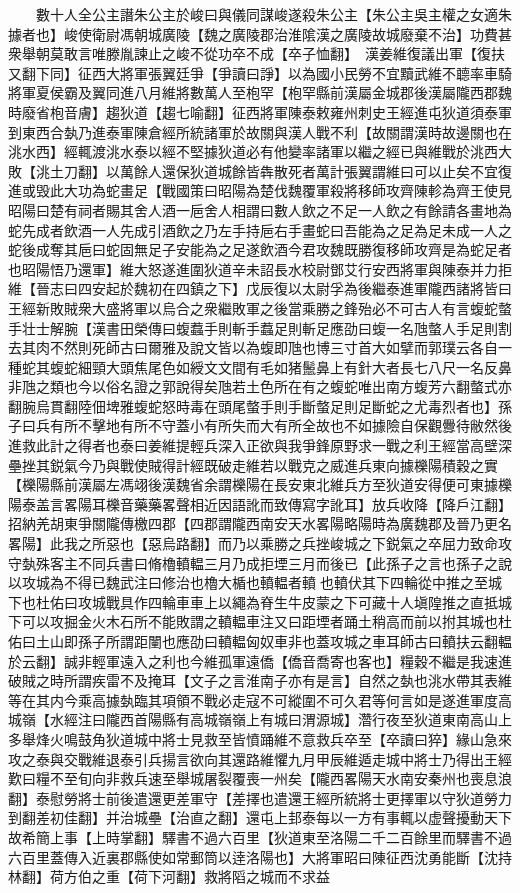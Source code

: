 　　數十人全公主譖朱公主於峻曰與儀同謀峻遂殺朱公主【朱公主吳主權之女適朱據者也】峻使衛尉馮朝城廣陵【魏之廣陵郡治淮隂漢之廣陵故城廢棄不治】功費甚衆舉朝莫敢言唯滕胤諫止之峻不從功卒不成【卒子恤翻】　漢姜維復議出軍【復扶又翻下同】征西大將軍張翼廷爭【爭讀曰諍】以為國小民勞不宜黷武維不聼率車騎將軍夏侯霸及翼同進八月維將數萬人至枹罕【枹罕縣前漢屬金城郡後漢屬隴西郡魏時廢省枹音膚】趨狄道【趨七喻翻】征西將軍陳泰敕雍州刺史王經進屯狄道須泰軍到東西合埶乃進泰軍陳倉經所統諸軍於故關與漢人戰不利【故關謂漢時故邊關也在洮水西】經輒渡洮水泰以經不堅據狄道必有他變率諸軍以繼之經已與維戰於洮西大敗【洮土刀翻】以萬餘人還保狄道城餘皆犇散死者萬計張翼謂維曰可以止矣不宜復進或毁此大功為蛇畫足【戰國策曰昭陽為楚伐魏覆軍殺將移師攻齊陳軫為齊王使見昭陽曰楚有祠者賜其舍人酒一巵舍人相謂曰數人飲之不足一人飲之有餘請各畫地為蛇先成者飲酒一人先成引酒飲之乃左手持巵右手畫蛇曰吾能為之足為足未成一人之蛇後成奪其巵曰蛇固無足子安能為之足遂飲酒今君攻魏既勝復移師攻齊是為蛇足者也昭陽悟乃還軍】維大怒遂進圍狄道辛未詔長水校尉鄧艾行安西將軍與陳泰并力拒維【晉志曰四安起於魏初在四鎮之下】戊辰復以太尉孚為後繼泰進軍隴西諸將皆曰王經新敗賊衆大盛將軍以烏合之衆繼敗軍之後當乘勝之鋒殆必不可古人有言蝮蛇螫手壮士解腕【漢書田榮傳曰蝮蠚手則斬手蠚足則斬足應劭曰蝮一名虺螫人手足則割去其肉不然則死師古曰爾雅及說文皆以為蝮即虺也博三寸首大如擘而郭璞云各自一種蛇其蝮蛇細頸大頭焦尾色如綬文文間有毛如猪鬛鼻上有針大者長七八尺一名反鼻非虺之類也今以俗名證之郭說得矣虺若土色所在有之蝮蛇唯出南方蝮芳六翻螫式亦翻腕烏貫翻陸佃埤雅蝮蛇怒時毒在頭尾螫手則手斷螫足則足斷蛇之尤毒烈者也】孫子曰兵有所不擊地有所不守蓋小有所失而大有所全故也不如據險自保觀釁待敝然後進救此計之得者也泰曰姜維提輕兵深入正欲與我爭鋒原野求一戰之利王經當高壁深壘挫其鋭氣今乃與戰使賊得計經既破走維若以戰克之威進兵東向據櫟陽積穀之實【櫟陽縣前漢屬左馮翊後漢魏省余謂櫟陽在長安東北維兵方至狄道安得便可東據櫟陽泰盖言畧陽耳櫟音藥藥畧聲相近因語訛而致傳寫字訛耳】放兵收降【降戶江翻】招納羌胡東爭關隴傳檄四郡【四郡謂隴西南安天水畧陽略陽時為廣魏郡及晉乃更名畧陽】此我之所惡也【惡烏路翻】而乃以乘勝之兵挫峻城之下鋭氣之卒屈力致命攻守埶殊客主不同兵書曰脩櫓轒輼三月乃成拒堙三月而後已【此孫子之言也孫子之說以攻城為不得已魏武注曰修治也櫓大楯也轒輼者轒也轒伏其下四輪從中推之至城下也杜佑曰攻城戰具作四輪車車上以繩為脊生牛皮蒙之下可藏十人塡隍推之直抵城下可以攻掘金火木石所不能敗謂之轒輼車注又曰距堙者踊土稍高而前以拊其城也杜佑曰土山即孫子所謂距闉也應劭曰轒輼匈奴車非也蓋攻城之車耳師古曰轒扶云翻輼於云翻】誠非輕軍遠入之利也今維孤軍遠僑【僑音喬寄也客也】糧穀不繼是我速進破賊之時所謂疾雷不及掩耳【文子之言淮南子亦有是言】自然之埶也洮水帶其表維等在其内今乘高據埶臨其項領不戰必走寇不可縱圍不可久君等何言如是遂進軍度高城嶺【水經注曰隴西首陽縣有高城嶺嶺上有城曰渭源城】濳行夜至狄道東南高山上多舉烽火鳴鼓角狄道城中將士見救至皆憤踊維不意救兵卒至【卒讀曰猝】緣山急來攻之泰與交戰維退泰引兵揚言欲向其還路維懼九月甲辰維遁走城中將士乃得出王經歎曰糧不至旬向非救兵速至舉城屠裂覆喪一州矣【隴西畧陽天水南安秦州也喪息浪翻】泰慰勞將士前後遣還更差軍守【差擇也遣還王經所統將士更擇軍以守狄道勞力到翻差初佳翻】并治城壘【治直之翻】還屯上邽泰每以一方有事輒以虚聲擾動天下故希簡上事【上時掌翻】驛書不過六百里【狄道東至洛陽二千二百餘里而驛書不過六百里蓋傳入近裏郡縣使如常郵筒以逹洛陽也】大將軍昭曰陳征西沈勇能斷【沈持林翻】荷方伯之重【荷下河翻】救將䧟之城而不求益